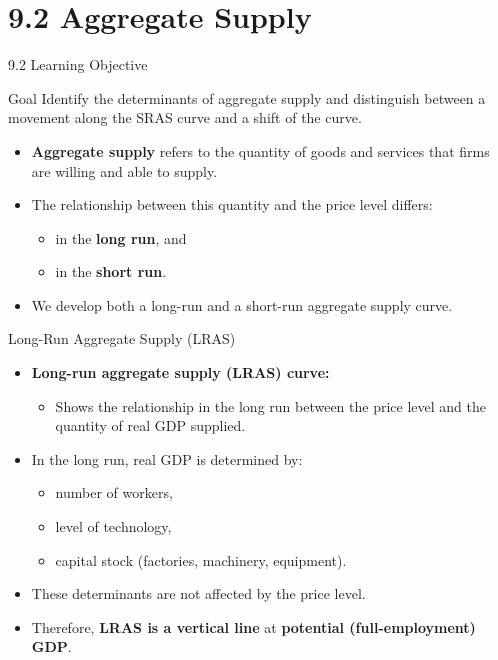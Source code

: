 \documentclass[aspectratio=169]{beamer}
\begin{document}
\section{9.2 Aggregate Supply}

\begin{frame}{9.2 Learning Objective}
\transfade
\begin{block}{Goal}
Identify the determinants of aggregate supply and distinguish between a movement along the SRAS curve and a shift of the curve.
\end{block}
\begin{itemize}[<+->]
  \item \textbf{Aggregate supply} refers to the quantity of goods and services that firms are willing and able to supply.
  \item The relationship between this quantity and the price level differs:
  \begin{itemize}[<+->]
    \item in the \textbf{long run}, and
    \item in the \textbf{short run}.
  \end{itemize}
  \item We develop both a long-run and a short-run aggregate supply curve.
\end{itemize}
\end{frame}

\begin{frame}{Long-Run Aggregate Supply (LRAS)}
\transfade
\begin{itemize}[<+->]
  \item \textbf{Long-run aggregate supply (LRAS) curve:}
  \begin{itemize}[<+->]
    \item Shows the relationship in the long run between the price level and the quantity of real GDP supplied.
  \end{itemize}
  \item In the long run, real GDP is determined by:
  \begin{itemize}[<+->]
    \item number of workers,
    \item level of technology,
    \item capital stock (factories, machinery, equipment).
  \end{itemize}
  \item These determinants are not affected by the price level.
  \item Therefore, \textbf{LRAS is a vertical line} at \textbf{potential (full-employment) GDP}.
\end{itemize}
\end{frame}
\end{document}
